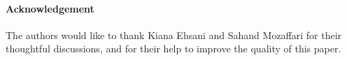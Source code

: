 \documentclass[envcountsame]{cls/cccg15}
\renewcommand{\O}{\ensuremath{{O}}}
\newcommand{\eps}{\varepsilon}
\newcommand{\REM}[1]{}
\begin{document}

\REM{ }%
\paragraph{Acknowledgement}
The authors would like to thank Kiana Ehsani and Sahand Mozaffari 
for their thoughtful discussions, 
and for their help to improve the quality of this paper.
\end{document}
